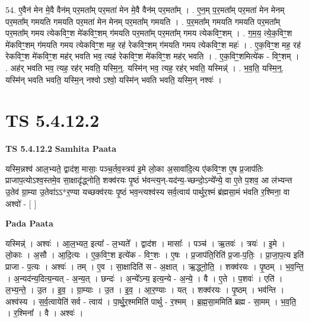 \documentclass[17pt]{extarticle}
\begin{document}
54. ए॒वैन॑ मेन मे॒वै वैन॑म् पर॒मता᳚म् पर॒मता॑ मेन मे॒वै वैन॑म् पर॒मता᳚म् । . ए॒न॒म् प॒र॒मता᳚म् पर॒मता॑ मेन मेनम् पर॒मता᳚म् गमयति गमयति पर॒मता॑ मेन मेनम् पर॒मता᳚म् गमयति । . प॒र॒मता᳚म् गमयति गमयति पर॒मता᳚म् पर॒मता᳚म् गमय त्येकविꣳ॒॒श मे॑कविꣳ॒॒शम् ग॑मयति पर॒मता᳚म् पर॒मता᳚म् गमय त्येकविꣳ॒॒शम् । . ग॒म॒य॒ त्ये॒क॒विꣳ॒॒श मे॑कविꣳ॒॒शम् ग॑मयति गमय त्येकविꣳ॒॒श मह॒ रह॑ रेकविꣳ॒॒शम् ग॑मयति गमय त्येकविꣳ॒॒श महः॑ । . ए॒क॒विꣳ॒॒श मह॒ रह॑ रेकविꣳ॒॒श मे॑कविꣳ॒॒श मह॑र् भवति भव॒ त्यह॑ रेकविꣳ॒॒श मे॑कविꣳ॒॒श मह॑र् भवति । . ए॒क॒विꣳ॒॒शमित्ये॑क - विꣳ॒॒शम् । . अह॑र् भवति भव॒ त्यह॒ रह॑र् भवति॒ यस्मि॒न्॒. यस्मि॑न् भव॒ त्यह॒ रह॑र् भवति॒ यस्मिन्न्॑ । . भ॒व॒ति॒ यस्मि॒न्॒. यस्मि॑न् भवति भवति॒ यस्मि॒न् नश्वो ऽश्वो॒ यस्मि॑न् भवति भवति॒ यस्मि॒न् नश्वः॑ । \newline
\pagebreak
{}

\section{ TS 5.4.12.2 }

\textbf{TS 5.4.12.2 } \newline
\textbf{Samhita Paata} \newline

यस्मि॒न्नश्व॑ आल॒भ्यते॒ द्वाद॑श॒ मासाः॒ पञ्च॒र्तव॒स्त्रय॑ इ॒मे लो॒का अ॒सावा॑दि॒त्य ए॑कविꣳ॒॒श ए॒ष प्र॒जाप॑तिः प्राजाप॒त्योऽश्व॒स्तमे॒व सा॒क्षादृ॑द्ध्नोति॒ शक्व॑रयः पृ॒ष्ठं भ॑वन्त्य॒न्-यद॑न्य॒-च्छन्दो॒ऽन्ये᳚न्ये॒ वा ए॒ते प॒शव॒ आ ल॑भ्यन्त उ॒तेव॑ ग्रा॒म्या उ॒तेवा॑ऽऽ*र॒ण्या यच्छक्व॑रयः पृ॒ष्ठं भव॒न्त्यश्व॑स्य सर्व॒त्वाय॑ पार्थुर॒श्मं ब्र॑ह्मसा॒मं भ॑वति र॒श्मिना॒ वा अश्वो॑ - [  ] \newline

\textbf{Pada Paata} \newline

यस्मिन्न्॑ । अश्वः॑ । आ॒ल॒भ्यत॒ इत्या᳚ - ल॒भ्यते᳚ । द्वाद॑श । मासाः᳚ । पञ्च॑ । ऋ॒तवः॑ । त्रयः॑ । इ॒मे । लो॒काः । अ॒सौ । आ॒दि॒त्यः । ए॒क॒विꣳ॒॒श इत्ये॑क - विꣳ॒॒शः । ए॒षः । प्र॒जाप॑ति॒रिति॑ प्र॒जा-प॒तिः॒ । प्रा॒जा॒प॒त्य इति॑ प्राजा - प॒त्यः । अश्वः॑ । तम् । ए॒व । सा॒क्षादिति॑ स - अ॒क्षात् । ऋ॒द्ध्नो॒ति॒ । शक्व॑रयः । पृ॒ष्ठम् । भ॒व॒न्ति॒ । अ॒न्यद॑न्य॒दित्य॒न्यत् - अ॒न्य॒त् । छन्दः॑ । अ॒न्ये᳚ऽन्य॒ इत्य॒न्ये - अ॒न्ये॒ । वै । ए॒ते । प॒शवः॑ । एति॑ । ल॒भ्य॒न्ते॒ । उ॒त । इ॒व॒ । ग्रा॒म्याः । उ॒त । इ॒व॒ । आ॒र॒ण्याः । यत् । शक्व॑रयः । पृ॒ष्ठम् । भव॑न्ति । अश्व॑स्य । स॒र्व॒त्वायेति॑ सर्व - त्वाय॑ । पा॒र्थु॒र॒श्ममिति॑ पार्थु - र॒श्मम् । ब्र॒ह्म॒सा॒ममिति॑ ब्रह्म - सा॒मम् । भ॒व॒ति॒ । र॒श्मिना᳚ । वै । अश्वः॑ ।  \newline
\end{document}

